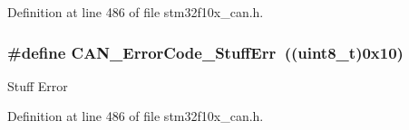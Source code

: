 Definition at line 486 of file stm32f10x\+\_\+can.\+h.

\subsubsection[{\texorpdfstring{C\+A\+N\+\_\+\+Error\+Code\+\_\+\+Stuff\+Err}{CAN_ErrorCode_StuffErr}}]{\setlength{\rightskip}{0pt plus 5cm}\#define C\+A\+N\+\_\+\+Error\+Code\+\_\+\+Stuff\+Err~(({\bf uint8\+\_\+t})0x10)}\hypertarget{group___c_a_n___error___code__constants_gaa733d1c078472912c3bf60fbdc53734d}{}\label{group___c_a_n___error___code__constants_gaa733d1c078472912c3bf60fbdc53734d}
Stuff Error 

Definition at line 486 of file stm32f10x\+\_\+can.\+h.

